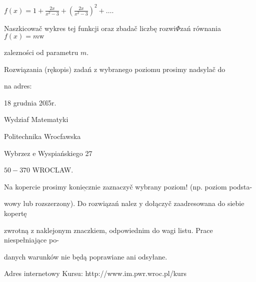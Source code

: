 \documentclass[a4paper,12pt]{article}
\begin{document}
$f(x)=1+\displaystyle \frac{2x}{x^{2}-3}+(\frac{2x}{x^{2}-3})^{2}+\ldots.$

Naszkicowač wykres tej funkcji oraz zbadač liczbę rozwi$\Phi$zań równania $f(x) = m \mathrm{w}$

zalezności od parametru $m.$

Rozwiązania (rękopis) zadań z wybranego poziomu prosimy nadsylač do

na adres:

18 grudnia 20l5r.

Wydziaf Matematyki

Politechnika Wrocfawska

Wybrzez $\mathrm{e}$ Wyspiańskiego 27

$50-370$ WROCLAW.

Na kopercie prosimy $\underline{\mathrm{k}\mathrm{o}\mathrm{n}\mathrm{i}\mathrm{e}\mathrm{c}\mathrm{z}\mathrm{n}\mathrm{i}\mathrm{e}}$ zaznaczyč wybrany poziom! (np. poziom podsta-

wowy lub rozszerzony). Do rozwiązań nalez $\mathrm{y}$ dołączyč zaadresowana do siebie kopertę

zwrotną $\mathrm{z}$ naklejonym znaczkiem, odpowiednim do wagi listu. Prace niespełniające po-

danych warunków nie będą poprawiane ani odsyłane.

Adres internetowy Kursu: http://www.im.pwr.wroc.pl/kurs
\end{document}
